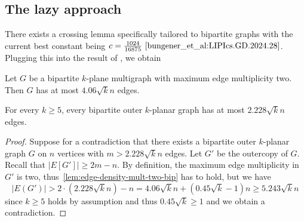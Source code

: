 \documentclass[nolineno,a4paper,USenglish,cleveref,autoref,thm-restate]
{socg}
\begin{document}
\subsection{The lazy approach}
There exists a crossing lemma specifically tailored to bipartite graphs with the current best constant being $c = \frac{1024}{16875}~\cite{bungener_et_al:LIPIcs.GD.2024.28}$. Plugging this into the result of \cite{DBLP:journals/cpc/Szekely97}, we obtain
\begin{lemma}\label{lem:edge-density-mult-two-bip}
Let $G$ be a bipartite $k$-plane multigraph with maximum edge multiplicity two. Then $G$ has at most $4.06\sqrt{k}n$ edges.
\end{lemma}
\begin{theorem}
    For every $k \geq 5$, every bipartite outer $k$-planar graph has at most $2.228\sqrt{k}n$ edges.
\end{theorem}
\begin{proof}
Suppose for a contradiction that there exists a bipartite outer $k$-planar graph $G$ on $n$ vertices with $m > 2.228\sqrt{k}n$ edges.
Let $G'$ be the outercopy of $G$.
Recall that $|E[G']| \geq 2m-n$.
By definition, the maximum edge multiplicity in $G'$ is two, thus~\cref{lem:edge-density-mult-two-bip} has to hold, but we have
\[|E(G')| > 2\cdot(2.228\sqrt{k}n)-n = 4.06\sqrt{k}n +(0.45\sqrt{k} - 1)n \geq 5.243\sqrt{k}n\]
since $k\geq 5$ holds by assumption and thus $0.45\sqrt{k} \geq 1$ and we obtain a contradiction.
\end{proof}
\end{document}
